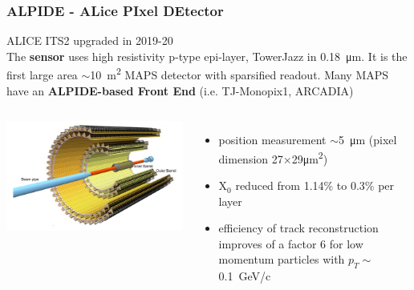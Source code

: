     \begin{frame}
        \frametitle{ALPIDE - ALice PIxel DEtector}
        ALICE ITS2 upgraded in 2019-20\\
        \smallskip
        The \textbf{sensor} uses high resistivity p-type epi-layer, TowerJazz in \SI{0.18}{\um}. It is the first large area $\sim$\SI{10}{m\squared} MAPS detector with sparsified readout.
        Many MAPS have an \textbf{ALPIDE-based Front End} (i.e. TJ-Monopix1, ARCADIA)
        \begin{columns}
                \includegraphics[width=1.3\linewidth]{figures/pixel_detectors_usage/alice.png}
            \begin{itemize}
                \item position measurement $\sim$\SI{5}{\um} (pixel dimension 27$\times$29\si{\um\squared})
                \item X$_0$ reduced from 1.14\% to 0.3\% per layer
                \item efficiency of track reconstruction improves of a factor 6 for low momentum particles with $p_T \sim$\SI{0.1}{GeV/c}
            \end{itemize}
        \end{columns}
    \end{frame} 


